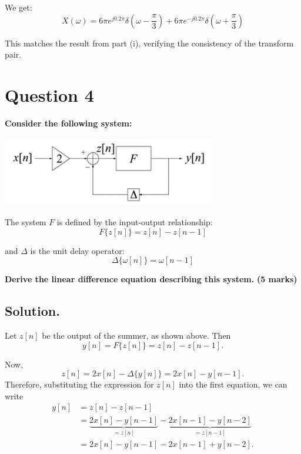\documentclass[12pt]{article}
\begin{document}
    We get:
    \[
    X(\omega) = 6\pi e^{j0.2\pi} \delta\left(\omega - \frac{\pi}{3}\right) + 6\pi e^{-j0.2\pi} \delta\left(\omega + \frac{\pi}{3}\right)
    \]
    
    \noindent This matches the result from part (i), verifying the consistency of the transform pair. 
    
    
    
    
    
    
    \section*{Question 4}
    
    \noindent \textbf{Consider the following system:}
    
    \bigskip
    
    \begin{center}
    	\includegraphics[width=0.7\textwidth]{images/image1}
    \end{center}
    \noindent The system \( F \) is defined by the input-output relationship:
    \[
    F\{z[n]\} = z[n] - z[n-1]
    \]
    
    \noindent and \( \Delta \) is the unit delay operator:
    \[
    \Delta\{\omega[n]\} = \omega[n - 1]
    \]
    
    \noindent \textbf{Derive the linear difference equation describing this system.} \textbf{(5 marks)}
  
    \subsection*{Solution.} Let \( z[n] \) be the output of the summer, as shown above. Then
    \[
    y[n] = F\{z[n]\} = z[n] - z[n-1].
    \]
    
    Now,
    \[
    z[n] = 2x[n] - \Delta\{y[n]\} = 2x[n] - y[n-1].
    \]
    Therefore, substituting the expression for \( z[n] \) into the first equation, we can write
    \[
    \begin{aligned}
    	y[n] &= z[n] - z[n-1] \\
    	&= \underbrace{2x[n] - y[n-1]}_{=z[n]} - \underbrace{2x[n-1] - y[n-2]}_{=z[n-1]} \\
    	&= 2x[n] - y[n-1] - 2x[n-1] + y[n-2].
    \end{aligned}
    \]
    
\end{document}
